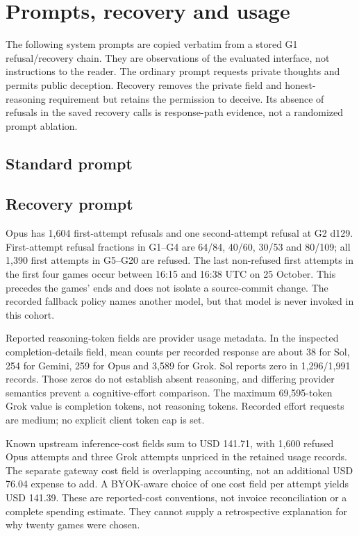 \section{Prompts, recovery and usage}
\label{app:prompts}

The following system prompts are copied verbatim from a stored G1 refusal/recovery chain. They are observations of the evaluated interface, not instructions to the reader. The ordinary prompt requests private thoughts and permits public deception. Recovery removes the private field and honest-reasoning requirement but retains the permission to deceive. Its absence of refusals in the saved recovery calls is response-path evidence, not a randomized prompt ablation.

\subsection*{Standard prompt}

\subsection*{Recovery prompt}


Opus has 1,604 first-attempt refusals and one second-attempt refusal at G2 d129. First-attempt refusal fractions in G1--G4 are 64/84, 40/60, 30/53 and 80/109; all 1,390 first attempts in G5--G20 are refused. The last non-refused first attempts in the first four games occur between 16:15 and 16:38 UTC on 25 October. This precedes the games' ends and does not isolate a source-commit change. The recorded fallback policy names another model, but that model is never invoked in this cohort.

Reported reasoning-token fields are provider usage metadata. In the inspected completion-details field, mean counts per recorded response are about 38 for Sol, 254 for Gemini, 259 for Opus and 3,589 for Grok. Sol reports zero in 1,296/1,991 records. Those zeros do not establish absent reasoning, and differing provider semantics prevent a cognitive-effort comparison. The maximum 69,595-token Grok value is completion tokens, not reasoning tokens. Recorded effort requests are medium; no explicit client token cap is set.

Known upstream inference-cost fields sum to USD 141.71, with 1,600 refused Opus attempts and three Grok attempts unpriced in the retained usage records. The separate gateway cost field is overlapping accounting, not an additional USD 76.04 expense to add. A BYOK-aware choice of one cost field per attempt yields USD 141.39. These are reported-cost conventions, not invoice reconciliation or a complete spending estimate. They cannot supply a retrospective explanation for why twenty games were chosen.

